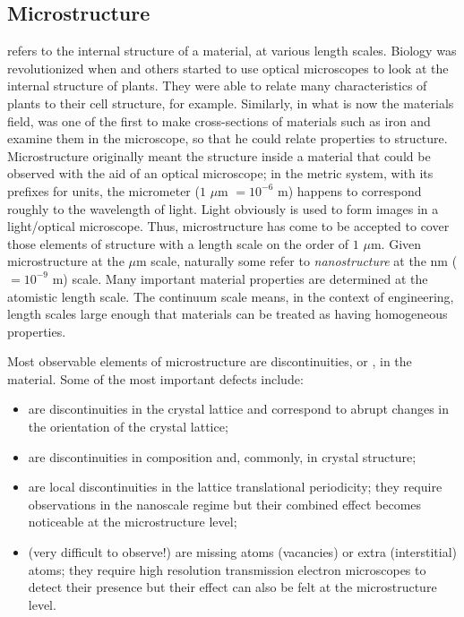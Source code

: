 \subsection{Microstructure}
 refers to the internal structure of a material, at various length scales.  Biology was revolutionized when  and others started to use optical microscopes to look at the internal structure of plants.  They were able to relate many characteristics of plants to their cell structure, for example.  Similarly, in what is now the materials field,  was one of the first to make cross-sections of materials such as iron and examine them in the microscope, so that he could relate properties to structure.  Microstructure originally meant the structure inside a material that could be observed with the aid of an optical microscope; in the metric system, with its prefixes for units, the micrometer ($1$ $\mu$m $= 10^{-6}$ m) happens to correspond roughly to the wavelength of light.  Light obviously is used to form images in a light/optical microscope.  Thus, microstructure has come to be accepted to cover those elements of structure with a length scale on the order of $1$ $\mu$m.  Given microstructure at the $\mu$m scale, naturally some refer to \textit{nanostructure} at the nm ($=10^{-9}$ m) scale.  Many important material properties are determined at the atomistic length scale. The continuum scale means, in the context of engineering, length scales large enough that materials can be treated as having homogeneous properties.

Most observable elements of microstructure are discontinuities, or , in the material.  Some of the most important defects include:
\begin{itemize}
	\item {}  are discontinuities in the crystal lattice and correspond to abrupt changes in the orientation of the crystal lattice;
	\item {}  are discontinuities in composition and, commonly, in crystal structure;
	\item {}  are local discontinuities in the lattice translational periodicity; they require observations in the nanoscale regime but their combined effect becomes noticeable at the microstructure level;
	\item {} (very difficult to observe!)  are missing atoms (vacancies) or extra (interstitial) atoms; they require high resolution transmission electron microscopes to detect their presence but their effect can also be felt at the microstructure level.
\end{itemize}

